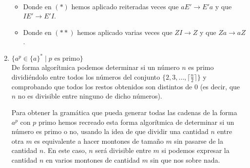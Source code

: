 \begin{ejercicio}
\begin{enumerate}
\begin{align*}
            \end{align*}
            \begin{itemize}
                \item Donde en $(\ast)$ hemos aplicado reiteradas veces que $aE'\rightarrow E'a$ y que $IE'\rightarrow E'I$.
                \item Donde en $(\ast\ast)$ hemos aplicado varias veces que $ZI\rightarrow Z$ y que $Za\rightarrow aZ$.
            \end{itemize}
        \item $\{a^p \in \{a\}^{\ast} \mid p \text{ es primo}\}$\\

        De forma algorítmica podemos determinar si un número $n$ es primo dividiéndolo entre todos los números del conjunto $\{2, 3, \ldots, \lceil\frac{n}{2}\rceil\}$ y comprobando que todos los restos obtenidos son distintos de 0 (es decir, que $n$ no es divisible entre ninguno de dicho números).

        Para obtener la gramática que pueda generar todas las cadenas de la forma $a^p$ con $p$ primo hemos recreado esta forma algorítmica de determinar si un número es primo o no, usando la idea de que dividir una cantidad $n$ entre otra $m$ es equivalente a hacer montones de tamaño $m$ sin pasarse de la cantidad $n$. En este caso, $n$ será divisible entre $m$ si podemos expresar la cantidad $n$ en varios montones de cantidad $m$ sin que nos sobre nada.


\end{enumerate}
\end{ejercicio}
